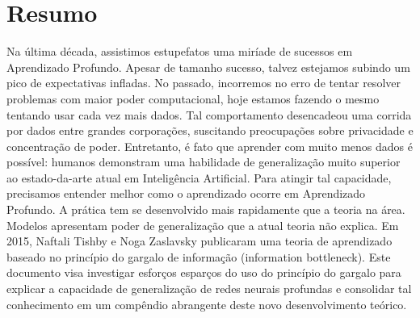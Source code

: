 \begin{otherlanguage}{brazilian}
\chapter*{Resumo}
Na última década, assistimos estupefatos uma miríade de sucessos em Aprendizado Profundo. Apesar de tamanho sucesso, talvez estejamos subindo um pico de expectativas infladas. No passado, incorremos no erro de tentar resolver problemas com maior poder computacional, hoje estamos fazendo o mesmo tentando usar cada vez mais dados. Tal comportamento desencadeou uma corrida por dados entre grandes corporações, suscitando preocupações sobre privacidade e concentração de poder. Entretanto, é fato que aprender com muito menos dados é possível: humanos demonstram uma habilidade de generalização muito superior ao estado-da-arte atual em Inteligência Artificial. Para atingir tal capacidade, precisamos entender melhor como o aprendizado ocorre em Aprendizado Profundo.  A prática tem se desenvolvido mais rapidamente que a teoria na área. Modelos apresentam poder de generalização que a atual teoria não explica. Em 2015, Naftali Tishby e Noga Zaslavsky publicaram uma teoria de aprendizado baseado no princípio do gargalo de informação (information bottleneck). Este documento visa investigar esforços esparços do uso do princípio do gargalo para explicar a capacidade de generalização de redes neurais profundas e consolidar tal conhecimento em um compêndio abrangente deste novo desenvolvimento teórico.
\end{otherlanguage}

\endgroup

\vfill
